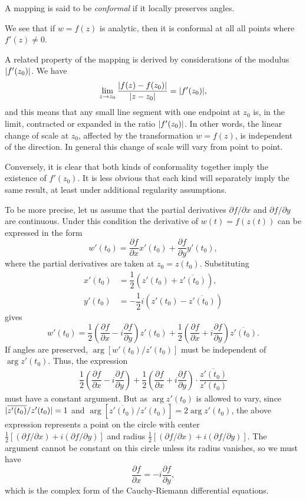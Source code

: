 \begin{definition}
	A mapping is said to be \emph{conformal} if it locally preserves angles.
\end{definition}

We see that if $w=f(z)$ is analytic, then it is conformal at all all points where $f'(z) \neq 0$.

A related property of the mapping is derived by considerations of the modulus $\lvert f'(z_0) \rvert$. We have $$\lim_{z \rightarrow z_0} \dfrac{\lvert f(z)-f(z_0) \rvert}{\lvert z-z_0 \rvert}=\lvert f'(z_0) \rvert,$$ and this means that any small line segment with one endpoint at $z_0$ is, in the limit, contracted or expanded in the ratio $\lvert f'(z_0) \rvert$. In other words, the linear change of scale at $z_0$, affected by the transformation $w=f(z)$, is independent of the direction. In general this change of scale will vary from point to point.

Conversely, it is clear that both kinds of conformality together imply the existence of $f'(z_0)$. It is less obvious that each kind will separately imply the same result, at least under additional regularity assumptions.

To be more precise, let us assume that the partial derivatives $\partial f/\partial x$ and $\partial f/\partial y$ are continuous. Under this condition the derivative of $w(t)=f(z(t))$ can be expressed in the form $$w'(t_0)=\dfrac{\partial f}{\partial x}x'(t_0)+\dfrac{\partial f}{\partial y}y'(t_0),$$ where the partial derivatives are taken at $z_0=z(t_0)$. Substituting
\begin{align*}
	x'(t_0) &=\dfrac{1}{2}\left(z'(t_0)+\overline{z'(t_0)}\right), \\
	y'(t_0) &=-\dfrac{1}{2}i\left(z'(t_0)-\overline{z'(t_0)}\right)
\end{align*}
gives $$w'(t_0)=\dfrac{1}{2}\left(\dfrac{\partial f}{\partial x}-i\dfrac{\partial f}{\partial y}\right)z'(t_0)+\dfrac{1}{2}\left(\dfrac{\partial f}{\partial x}+i\dfrac{\partial f}{\partial y}\right)\overline{z'(t_0)}.$$ If angles are preserved, $\arg [w'(t_0)/z'(t_0)]$ must be independent of $\arg z'(t_0)$. Thus, the expression
\begin{align}
\dfrac{1}{2}\left(\dfrac{\partial f}{\partial x}-i\dfrac{\partial f}{\partial y}\right)+\dfrac{1}{2}\left(\dfrac{\partial f}{\partial x}+i\dfrac{\partial f}{\partial y}\right) \cdot \dfrac{\overline{z'(t_0)}}{z'(t_0)}
\end{align}
must have a constant argument. But as $\arg z'(t_0)$ is allowed to vary, since $\lvert \overline{z'(t_0)}/z'(t_0) \rvert=1$ and $\arg \left[\overline{z'(t_0)}/z'(t_0)\right]=2 \arg z'(t_0)$, the above expression represents a point on the circle with center $\frac{1}{2}\left[(\partial f/\partial x)+i(\partial f/\partial y)\right]$ and radius $\frac{1}{2}\left[(\partial f/\partial x)+i(\partial f/\partial y)\right]$. The argument cannot be constant on this circle unless its radius vanishes, so we must have $$\dfrac{\partial f}{\partial x}=-i\dfrac{\partial f}{\partial y},$$ which is the complex form of the Cauchy-Riemann differential equations.


